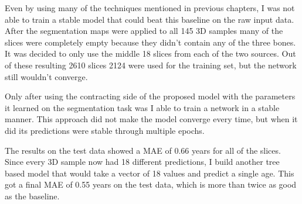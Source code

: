 Even by using many of the techniques mentioned in previous chapters, I was not able to train a stable model that could beat this baseline on the raw input data. After the segmentation maps were applied to all 145 3D samples many of the slices were completely empty because they didn't contain any of the three bones. It was decided to only use the middle 18 slices from each of the two sources. Out of these resulting 2610 slices 2124 were used for the training set, but the network still wouldn't converge.

Only after using the contracting side of the proposed model with the parameters it learned on the segmentation task was I able to train a network in a stable manner. This approach did not make the model converge every time, but when it did its predictions were stable through multiple epochs.

The results on the test data showed a MAE of 0.66 years for all of the slices. Since every 3D sample now had 18 different predictions, I build another tree based model that would take a vector of 18 values and predict a single age. This got a final MAE of 0.55 years on the test data, which is more than twice as good as the baseline.

\newpage